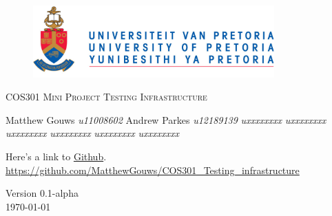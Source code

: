 \begin{titlepage}
	\begin{center}
		
		\begin{figure}[t]
			\centering
			\includegraphics[width=350px]{UP_Logo.png}
		\end{figure}
		
		\textsc{\LARGE COS301 Mini Project Testing \newline\newline Infrastructure}
		
		\begin{flushright} \large
			Matthew Gouws \emph{u11008602} \newline
			Andrew Parkes \emph{u12189139} \newline
			 \emph{uxxxxxxxx} \newline
			 \emph{uxxxxxxxx} \newline
			 \emph{uxxxxxxxx} \newline
			 \emph{uxxxxxxxx} \newline
			 \emph{uxxxxxxxx} \newline
			 \emph{uxxxxxxxx} \newline
		\end{flushright}
		
		\vfill
		
	Here's a link to \href{https://github.com/MatthewGouws/COS301_Testing_infrastructure}{Github}.\\
	\url{https://github.com/MatthewGouws/COS301_Testing_infrastructure}

	\vfill

	{\large Version 0.1-alpha}
	\\
	{\large \today}		
		
		
	\end{center}
\end{titlepage}
